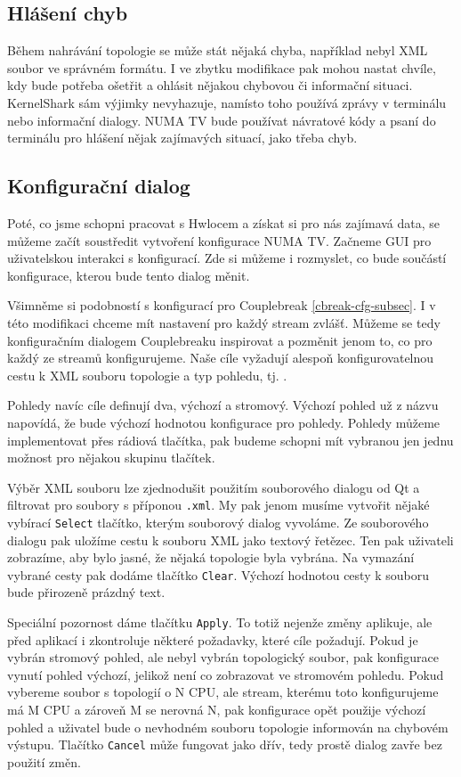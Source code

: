 \subsection{Hlášení chyb}

Během nahrávání topologie se může stát nějaká chyba, například nebyl XML soubor ve správném formátu. I ve zbytku modifikace pak mohou nastat chvíle, kdy bude potřeba ošetřit a ohlásit nějakou chybovou či informační situaci. KernelShark sám výjimky nevyhazuje, namísto toho používá zprávy v terminálu nebo informační dialogy. NUMA TV bude používat návratové kódy a psaní do terminálu pro hlášení nějak zajímavých situací, jako třeba chyb.

\subsection{Konfigurační dialog}
\label{numatv-cfg-subsec}

Poté, co jsme schopni pracovat s Hwlocem a získat si pro nás zajímavá data, se můžeme začít soustředit vytvoření konfigurace NUMA TV. Začneme GUI pro uživatelskou interakci s konfigurací. Zde si můžeme i rozmyslet, co bude součástí konfigurace, kterou bude tento dialog měnit.

Všimněme si podobností s konfigurací pro Couplebreak \ref{cbreak-cfg-subsec}. I v této modifikaci chceme mít nastavení pro každý stream zvlášť. Můžeme se tedy konfiguračním dialogem Couplebreaku inspirovat a pozměnit jenom to, co pro každý ze streamů konfigurujeme. Naše cíle vyžadují alespoň konfigurovatelnou cestu k XML souboru topologie a typ pohledu, tj. .

Pohledy navíc cíle definují dva, výchozí a stromový. Výchozí pohled už z názvu napovídá, že bude výchozí hodnotou konfigurace pro pohledy. Pohledy můžeme implementovat přes rádiová tlačítka, pak budeme schopni mít vybranou jen jednu možnost pro nějakou skupinu tlačítek.

Výběr XML souboru lze zjednodušit použitím souborového dialogu od Qt a filtrovat pro soubory s příponou \texttt{.xml}. My pak jenom musíme vytvořit nějaké vybírací \texttt{Select} tlačítko, kterým souborový dialog vyvoláme. Ze souborového dialogu pak uložíme cestu k souboru XML jako textový řetězec. Ten pak uživateli zobrazíme, aby bylo jasné, že nějaká topologie byla vybrána. Na vymazání vybrané cesty pak dodáme tlačítko \texttt{Clear}. Výchozí hodnotou cesty k souboru bude přirozeně prázdný text. 

Speciální pozornost dáme tlačítku \texttt{Apply}. To totiž nejenže změny aplikuje, ale před aplikací i zkontroluje některé požadavky, které cíle požadují. Pokud je vybrán stromový pohled, ale nebyl vybrán topologický soubor, pak konfigurace vynutí pohled výchozí, jelikož není co zobrazovat ve stromovém pohledu. Pokud vybereme soubor s topologií o N CPU, ale stream, kterému toto konfigurujeme má M CPU a zároveň M se nerovná N, pak konfigurace opět použije výchozí pohled a uživatel bude o nevhodném souboru topologie informován na chybovém výstupu. Tlačítko \texttt{Cancel} může fungovat jako dřív, tedy prostě dialog zavře bez použití změn.

